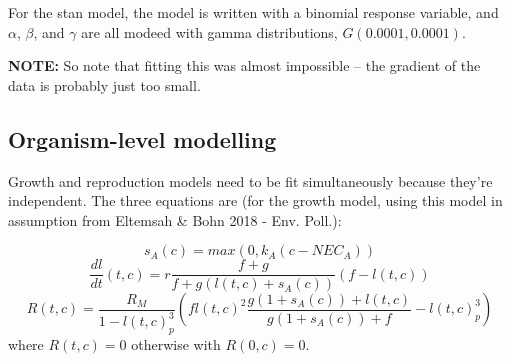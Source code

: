 \documentclass[
]{article}
\begin{document}
For the stan model, the model is written with a binomial response
variable, and \(\alpha\), \(\beta\), and \(\gamma\) are all modeed with
gamma distributions, \(G(0.0001, 0.0001)\).

\textbf{NOTE:} So note that fitting this was almost impossible -- the
gradient of the data is probably just too small.

\hypertarget{organism-level-modelling}{%
\subsection{Organism-level modelling}\label{organism-level-modelling}}

Growth and reproduction models need to be fit simultaneously because
they're independent. The three equations are (for the growth model,
using this model in assumption from Eltemsah \& Bohn 2018 - Env. Poll.):

\[s_A(c) = max(0, k_A(c - NEC_A))\]
\[\frac{dl}{dt}(t,c) = r\frac{f+g}{f + g(l(t,c)+s_A(c))}(f-l(t,c))\]
\[R(t, c) = \frac{R_M}{1-l(t,c)^3_p} \left( fl(t,c)^2\frac{g(1+s_A(c)) + l(t,c)}{g(1+s_A(c)) + f}-l(t,c)^3_p\right)\]
where \(R(t,c) = 0\) otherwise with \(R(0,c) = 0\).
\end{document}
